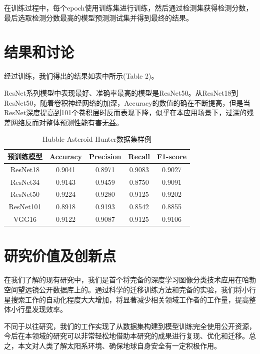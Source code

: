 \documentclass[12pt,a4paper]{article}%
\begin{document}
在训练过程中，每个epoch使用训练集进行训练，然后通过检测集获得检测分数，最后选取检测分数最高的模型预测测试集并得到最终的结果。

\section{结果和讨论}

经过训练，我们得出的结果如表中所示(Table 2)。

ResNet系列模型中表现最好、准确率最高的模型是ResNet50。从ResNet18到ResNet50，随着卷积神经网络的加深，Accuracy的数值的确在不断提高，但是当ResNet深度提高到101个卷积层时反而表现下降，似乎在本应用场景下，过深的残差网络反而对整体预测性能有害无益。

\begin{table}[H]%
    \centering
    \caption{\fontsize{10pt}{15pt}\selectfont Hubble Asteroid Hunter数据集样例}
    \begin{tabular}{ccccc}
        \toprule[1.5pt]
        预训练模型     & Accuracy & Precision & Recall & F1-score \\

        \midrule
        ResNet18  & 0.9041   & 0.8971    & 0.9083 & 0.9027   \\
        ResNet34  & 0.9143   & 0.9459    & 0.8750 & 0.9091   \\
        ResNet50  & 0.9224   & 0.9280    & 0.9125 & 0.9202   \\
        ResNet101 & 0.8918   & 0.9193    & 0.8542 & 0.8855   \\
        VGG16     & 0.9122   & 0.9087    & 0.9125 & 0.9106   \\
        \bottomrule[1.5pt]
    \end{tabular}
\end{table}


\section{研究价值及创新点}

在我们了解的现有研究中，我们是首个将完备的深度学习图像分类技术应用在哈勃空间望远镜公开数据库上的。通过科学的迁移训练方法和完备的实验，我们将小行星搜索工作的自动化程度大大增加，将显著减少相关领域工作者的工作量，提高整体小行星发现效率。

不同于以往研究，我们的工作实现了从数据集构建到模型训练完全使用公开资源，今后在本领域的研究可以非常轻松地借助本研究的成果进行复现、优化和迁移。总之，本文对人类了解太阳系环境、确保地球自身安全有一定积极作用。
\end{document}
